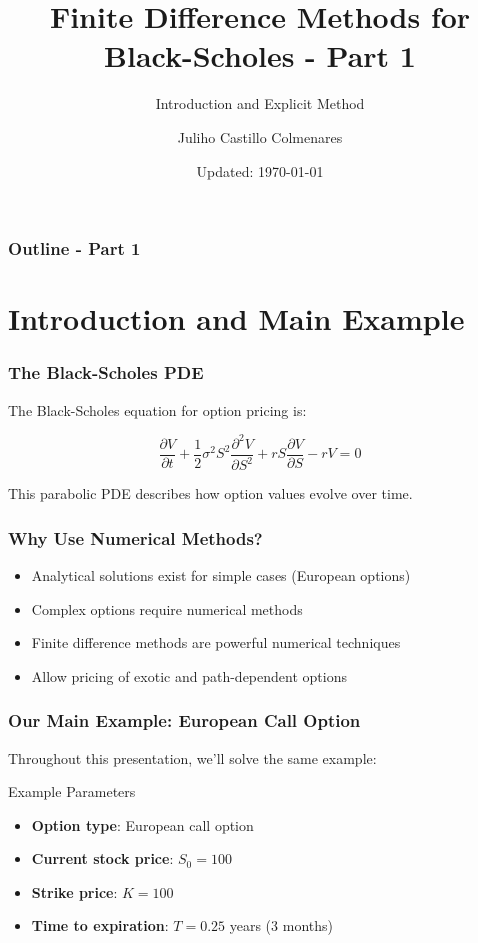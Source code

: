 \documentclass[aspectratio=169]{beamer}
\title{Finite Difference Methods for Black-Scholes - Part 1}
\subtitle{Introduction and Explicit Method}
\author{Juliho Castillo Colmenares}
\date{Updated: \today}
\begin{document}
\begin{frame}
\titlepage
\end{frame}

\begin{frame}
\frametitle{Outline - Part 1}
\tableofcontents
\end{frame}

\section{Introduction and Main Example}

\begin{frame}
\frametitle{The Black-Scholes PDE}
The Black-Scholes equation for option pricing is:

\[\frac{\partial V}{\partial t} + \frac{1}{2}\sigma^2 S^2 \frac{\partial^2 V}{\partial S^2} + rS \frac{\partial V}{\partial S} - rV = 0\]

This parabolic PDE describes how option values evolve over time.
\end{frame}

\begin{frame}
\frametitle{Why Use Numerical Methods?}
\begin{itemize}
\item Analytical solutions exist for simple cases (European options)
\item Complex options require numerical methods
\item Finite difference methods are powerful numerical techniques
\item Allow pricing of exotic and path-dependent options
\end{itemize}
\end{frame}

\begin{frame}
\frametitle{Our Main Example: European Call Option}
Throughout this presentation, we'll solve the same example:

\begin{block}{Example Parameters}
\begin{itemize}
\item \textbf{Option type}: European call option
\item \textbf{Current stock price}: $S_0 = 100$
\item \textbf{Strike price}: $K = 100$
\item \textbf{Time to expiration}: $T = 0.25$ years (3 months)
\end{itemize}
\end{block}
\end{frame}
\end{document}

